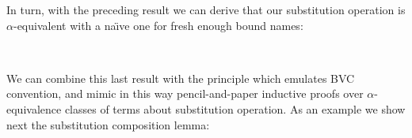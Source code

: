 \documentclass{entcs}
\newcommand{\alp}{\ensuremath{\alpha}}
\begin{document}

In turn, with the preceding result we can derive that our substitution operation is \alp-equivalent with a na\"\i ve one for fresh enough bound names:


\begin{code}%
\> \AgdaSymbol{:}  \AgdaSymbol{\{}  \AgdaSymbol{\}}         \<[39]%
\>[39]\<%
\\
\>[0]\<[2]%
\>[2]    \AgdaFunction{[}    \AgdaFunction{]}  \<[24]%
\>[24]  \AgdaSymbol{(} \AgdaFunction{[}    \AgdaFunction{]}\AgdaSymbol{)}\<%
\end{code}


We can combine this last result with the  principle which emulates BVC convention, and mimic in this way pencil-and-paper inductive proofs over \alp-equivalence classes of terms about substitution operation. As an example we show next the substitution composition lemma:


\begin{code}%
\> \AgdaSymbol{:}  \AgdaSymbol{\{}  \AgdaSymbol{\}}     \<%
\\
\> \AgdaSymbol{\{}\AgdaSymbol{\}} \AgdaSymbol{\{}\AgdaSymbol{\}} \AgdaSymbol{\{}\AgdaSymbol{\}}   \AgdaSymbol{=}         \<[39]%
\>[39]\<%
\\
\>[0]\<[2]%
\>[2] \AgdaSymbol{(} \AgdaFunction{[}    \AgdaFunction{]}\AgdaSymbol{)} \AgdaFunction{[}    \AgdaFunction{]}  \AgdaSymbol{(} \AgdaFunction{[}    \AgdaFunction{]}\AgdaSymbol{)}\AgdaFunction{[}    \AgdaFunction{[}    \AgdaFunction{]} \AgdaFunction{]}\<%
\end{code}
\end{document}
